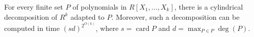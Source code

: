For every finite set \(P\) of polynomials in \(R[X_1,\ldots,X_k]\), there is a cylindrical decomposition of \(R^k\) adapted to \(P\). Moreover, such a decomposition can be computed in time \((sd)^{2^{O(k)}}\), where \(s=\operatorname{card} P\) and \(d=\max_{P\in P}\deg(P)\).